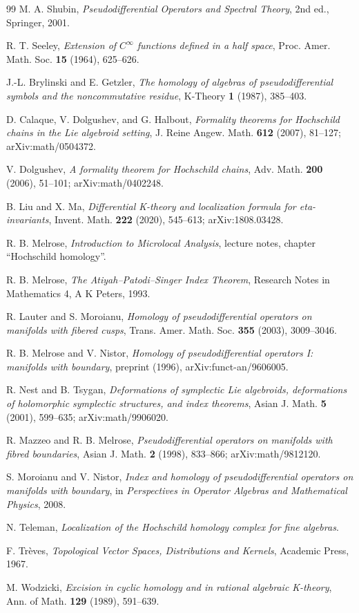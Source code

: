\documentclass[11pt,oneside,reqno]{article}
\theoremstyle{plain}
\theoremstyle{definition}
\theoremstyle{remark}
\begin{document}
\begin{thebibliography}{99}
M. A. Shubin,
\emph{Pseudodifferential Operators and Spectral Theory}, 2nd ed.,
Springer, 2001.

R. T. Seeley,
\emph{Extension of \(C^\infty\) functions defined in a half space},
Proc. Amer. Math. Soc. \textbf{15} (1964), 625--626.

J.-L. Brylinski and E. Getzler,
\emph{The homology of algebras of pseudodifferential symbols and the
noncommutative residue},
K-Theory \textbf{1} (1987), 385--403.

D. Calaque, V. Dolgushev, and G. Halbout,
\emph{Formality theorems for Hochschild chains in the Lie algebroid
setting},
J. Reine Angew. Math. \textbf{612} (2007), 81--127;
arXiv:math/0504372.

V. Dolgushev,
\emph{A formality theorem for Hochschild chains},
Adv. Math. \textbf{200} (2006), 51--101;
arXiv:math/0402248.

B. Liu and X. Ma,
\emph{Differential K-theory and localization formula for eta-invariants},
Invent. Math. \textbf{222} (2020), 545--613;
arXiv:1808.03428.

R. B. Melrose,
\emph{Introduction to Microlocal Analysis}, lecture notes, chapter
``Hochschild homology''.

R. B. Melrose,
\emph{The Atiyah--Patodi--Singer Index Theorem},
Research Notes in Mathematics 4, A K Peters, 1993.

R. Lauter and S. Moroianu,
\emph{Homology of pseudodifferential operators on manifolds with fibered
cusps}, Trans. Amer. Math. Soc. \textbf{355} (2003), 3009--3046.

R. B. Melrose and V. Nistor,
\emph{Homology of pseudodifferential operators I: manifolds with boundary},
preprint (1996), arXiv:funct-an/9606005.

R. Nest and B. Tsygan,
\emph{Deformations of symplectic Lie algebroids, deformations of holomorphic
symplectic structures, and index theorems},
Asian J. Math. \textbf{5} (2001), 599--635;
arXiv:math/9906020.

R. Mazzeo and R. B. Melrose,
\emph{Pseudodifferential operators on manifolds with fibred boundaries},
Asian J. Math. \textbf{2} (1998), 833--866;
arXiv:math/9812120.

S. Moroianu and V. Nistor,
\emph{Index and homology of pseudodifferential operators on manifolds with
boundary}, in \emph{Perspectives in Operator Algebras and Mathematical
Physics}, 2008.

N. Teleman,
\emph{Localization of the Hochschild homology complex for fine algebras}.

F. Tr\`eves,
\emph{Topological Vector Spaces, Distributions and Kernels},
Academic Press, 1967.

M. Wodzicki,
\emph{Excision in cyclic homology and in rational algebraic K-theory},
Ann. of Math. \textbf{129} (1989), 591--639.

\end{thebibliography}
\end{document}
